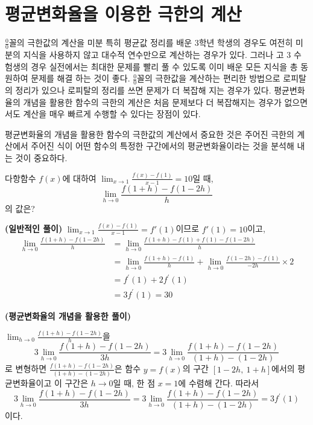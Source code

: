 \documentclass[11pt, a4paper]{book}
\begin{document}
\vspace{1em}
\section{평균변화율을 이용한 극한의 계산}
 $\frac{0}{0}$꼴의 극한값의 계산을 미분 특히 평균값 정리를 배운 3학년 학생의 경우도 여전히 미분의 지식을 사용하지 않고 대수적 연수만으로 계산하는 경우가 있다. 그러나 고 3 수험생의 경우 실전에서는 최대한 문제를 빨리 풀 수 있도록 이미 배운 모든 지식을 총 동원하여 문제를 해결 하는 것이 좋다. $\frac{0}{0}$꼴의 극한값을 계산하는 편리한 방법으로 로피탈의 정리가 있으나 로피탈의 정리를 쓰면 문제가 더 복잡해 지는 경우가 있다. 평균변화율의 개념을 활용한 함수의 극한의 계산은 처음 문제보다 더 복잡해지는 경우가 없으면서도 계산을 매우 빠르게 수행할 수 있다는 장점이 있다. 

평균변화율의 개념을 활용한 함수의 극한값의 계산에서 중요한 것은 주어진 극한의 계산에서 주어진 식이 어떤 함수의 특정한 구간에서의 평균변화율이라는 것을 분석해 내는 것이 중요하다. 
\vspace{1em}
\begin{example}
	다항함수 $f(x)$에 대하여 $\displaystyle\lim_{x\to 1}\frac{f(x)-f(1)}{x-1}=10$일 때,
	\begin{equation*}
		\displaystyle\lim_{h\to 0}\frac{f(1+h)-f(1-2h)}{h}
	\end{equation*}
의 값은?
\begin{solution}\textbf{(일반적인 풀이)}
 $\displaystyle\lim_{x\to 1}\frac{f(x)-f(1)}{x-1}=f'(1)$이므로 $f'(1)=10$이고,
	\begin{align*}
		\displaystyle\lim_{h\to 0}\frac{f(1+h)-f(1-2h)}{h}
		& =\displaystyle\lim_{h\to 0}\frac{f(1+h)-f(1)+ f(1)-f(1-2h)}{h}\\
		& =\displaystyle\lim_{h\to 0}\frac{f(1+h)-f(1)}{h}+\displaystyle\lim_{h\to 0}\frac{f(1-2h)-f(1)}{-2h}\times 2 \\
		& = f^{\prime}(1)+ 2 f^{\prime}(1)		\\
		& =3f^{\prime}(1)=30
	\end{align*}
\end{solution}
\begin{solution}\textbf{(평균변화율의 개념을 활용한 풀이)}
	
$\displaystyle\lim_{h\to 0}\frac{f(1+h)-f(1-2h)}{h}$을
\begin{equation*}
	 3\lim_{h\to 0}\frac{f(1+h)-f(1-2h)}{3h}=3\lim_{h\to 0}\frac{f(1+h)-f(1-2h)}{(1+h)-(1-2h)}
\end{equation*}
로 변형하면 $\frac{f(1+h)-f(1-2h)}{(1+h)-(1-2h)}$은 함수 $y=f(x)$의 구간 $[1-2h,\:1+h]$에서의 평균변화율이고 이 구간은 $h\to 0$일 때, 한 점 $x=1$에 수렴해 간다. 따라서 
	\begin{equation*}
	3\lim_{h\to 0}\frac{f(1+h)-f(1-2h)}{3h}=3\lim_{h\to 0}\frac{f(1+h)-f(1-2h)}{(1+h)-(1-2h)}=3f^{\prime}(1)
	\end{equation*}
	이다. 
\end{solution}
\end{example}
\end{document}
